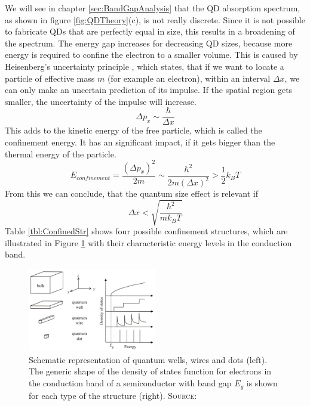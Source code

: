 		
		We will see in chapter \ref{sec:BandGapAnalysis} that the \gls{QD} absorption spectrum,  as shown in figure \ref{fig:QDTheory}(c), is not really discrete. Since it is
		not possible to fabricate \glspl{QD} that are perfectly equal in size, this results in a broadening of the spectrum.
		The energy gap increases for decreasing \gls{QD} sizes, because more energy is required to confine the electron to a smaller volume.
		This is caused by Heisenberg's uncertainty principle , which states, that if we want to locate a particle of effective mass $m$ (for example an electron),
		within an interval	$\Delta x$, we can only make an uncertain prediction of its impulse. If the spatial region gets smaller, the uncertainty
		of the impulse will	increase.
		\begin{equation}
			\Delta p_{x} \sim \frac{\hbar}{\Delta x}
		\end{equation}
		This adds to the kinetic energy of the free particle, which is called the confinement  energy. It has an significant impact, if it gets bigger
		than the thermal energy of the particle.
		\begin{equation}
			E_{confinement} = \frac{(\Delta p_{x})^2}{2 m} \sim \frac{\hbar^2}{2 m (\Delta x)^2} > \frac{1}{2} k_{B} T
		\end{equation}
		From this we can conclude, that the quantum size effect is relevant if
		\begin{equation}
			\Delta x < \sqrt{\frac{\hbar^2}{m k_{B} T}}
		\end{equation}
		Table \ref{tbl:ConfinedStr} shows four possible confinement structures, which are illustrated in Figure \ref{fig:ConfinedStr} with their
		characteristic energy levels  in	the conduction band.

		\begin{figure}[htbp]		
		\centering
		\includegraphics[width=0.5\textwidth]{Fig/ConfinedStructures.pdf}
		\caption{Schematic representation of quantum wells, wires and dots (left).
						 The generic shape of the density of states function for electrons in the
						 conduction band of a semiconductor with band gap $E_{g}$ is shown for each
						 type of the structure (right).
						 {\scshape Source:} \cite[p.143]{Fox}}
		\label{fig:ConfinedStr}
	\end{figure}
		
